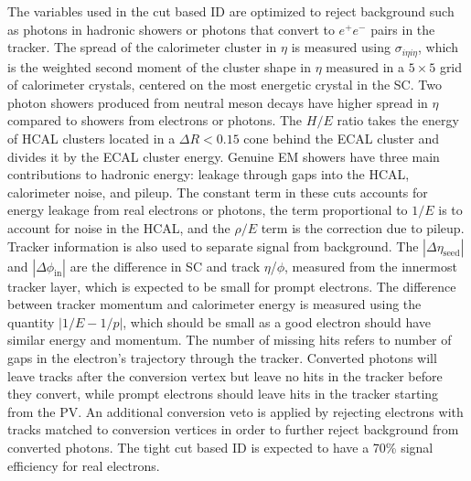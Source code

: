The variables used in the cut based ID are optimized to reject background such as photons in hadronic showers or photons that convert to $e^+e^-$ pairs in the tracker. The spread of the calorimeter cluster in $\eta$ is measured using $\sigma_{i\eta i\eta}$, which is the weighted second moment of the cluster shape in $\eta$ measured in a $5\times5$ grid of calorimeter crystals, centered on the most energetic crystal in the SC. Two photon showers produced from neutral meson decays have higher spread in $\eta$ compared to showers from electrons or photons. The $H/E$ ratio takes the energy of HCAL clusters located in a $\Delta R<0.15$ cone behind the ECAL cluster and divides it by the ECAL cluster energy. Genuine EM showers have three main contributions to hadronic energy: leakage through gaps into the HCAL, calorimeter noise, and pileup. The constant term in these cuts accounts for energy leakage from real electrons or photons, the term proportional to $1/E$ is to account for noise in the HCAL, and the $\rho/E$ term is the correction due to pileup. Tracker information is also used to separate signal from background. The $|\Delta\eta_\text{seed}|$ and $|\Delta\phi_\text{in}|$ are the difference in SC and track $\eta$/$\phi$, measured from the innermost tracker layer, which is expected to be small for prompt electrons. The difference between tracker momentum and calorimeter energy is measured using the quantity $|1/E-1/p|$, which should be small as a good electron should have similar energy and momentum. The number of missing hits refers to number of gaps in the electron's trajectory through the tracker. Converted photons will leave tracks after the conversion vertex but leave no hits in the tracker before they convert, while prompt electrons should leave hits in the tracker starting from the PV. An additional conversion veto is applied by rejecting electrons with tracks matched to conversion vertices in order to further reject background from converted photons. The tight cut based ID is expected to have a 70\% signal efficiency for real electrons.

